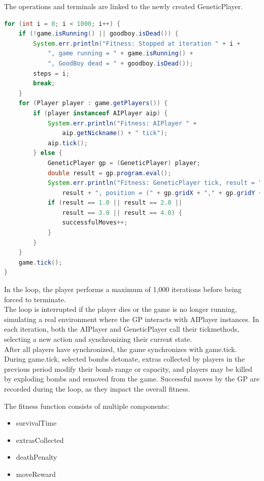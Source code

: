 \documentclass[sigconf]{acmart} %
\begin{document}
The operations and terminals are linked to the newly created GeneticPlayer. 

\begin{lstlisting}[language=Java]
for (int i = 0; i < 1000; i++) {
    if (!game.isRunning() || goodboy.isDead()) {
        System.err.println("Fitness: Stopped at iteration " + i +
            ", game running = " + game.isRunning() +
            ", GoodBoy dead = " + goodboy.isDead());
        steps = i;
        break;
    }
    for (Player player : game.getPlayers()) {
        if (player instanceof AIPlayer aip) {
            System.err.println("Fitness: AIPlayer " +
                aip.getNickname() + " tick");
            aip.tick();
        } else {
            GeneticPlayer gp = (GeneticPlayer) player;
            double result = gp.program.eval();
            System.err.println("Fitness: GeneticPlayer tick, result = " +
                result + ", position = (" + gp.gridX + "," + gp.gridY + ")");
            if (result == 1.0 || result == 2.0 ||
                result == 3.0 || result == 4.0) {
                successfulMoves++;
            }
        }
    }
    game.tick();
}
\end{lstlisting}

In the loop, the player performs a maximum of 1,000 iterations before being forced to terminate. \\ 
The loop is interrupted if the player dies or the game is no longer running, simulating a real environment where the GP interacts with AIPlayer instances. In each iteration, both the AIPlayer and GeneticPlayer call their tickmethods, selecting a new action and synchronizing their current state. \\ 
After all players have synchronized, the game synchronizes with game.tick. During game.tick, selected bombs detonate, extras collected by players in the previous period modify their bomb range or capacity, and players may be killed by exploding bombs and removed from the game. Successful moves by the GP are recorded during the loop, as they impact the overall fitness.

The fitness function consists of multiple components: 
\begin{itemize}
      \item survivalTime 
      \item extrasCollected 
      \item deathPenalty 
      \item moveReward 
\end{itemize}
\end{document}
